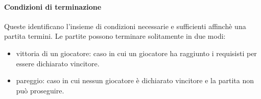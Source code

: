 \paragraph{Condizioni di terminazione}
%
Queste identificano l'insieme di condizioni necessarie e sufficienti affinchè una partita termini.
%
Le partite possono terminare solitamente in due modi:
\begin{itemize}
  \item vittoria di un giocatore: caso in cui un giocatore ha raggiunto i requisisti per essere dichiarato vincitore.
  \item pareggio: caso in cui nessun giocatore è dichiarato vincitore e la partita non può proseguire.
\end{itemize}